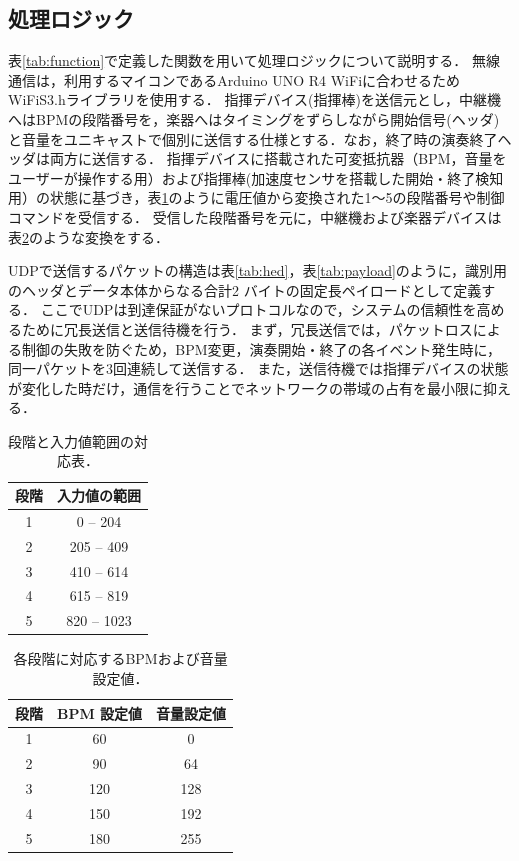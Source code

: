 \documentclass[lualatex,book,paper=a4paper,jafontsize=11.5pt,jafontscale=1.05]{jlreq}
\begin{document}
\subsection{処理ロジック}
表\ref{tab:function}で定義した関数を用いて処理ロジックについて説明する．
無線通信は，利用するマイコンであるArduino UNO R4 WiFiに合わせるためWiFiS3.hライブラリを使用する．
指揮デバイス(指揮棒)を送信元とし，中継機へはBPMの段階番号を，楽器へはタイミングをずらしながら開始信号(ヘッダ)と音量をユニキャストで個別に送信する仕様とする．なお，終了時の演奏終了ヘッダは両方に送信する．
指揮デバイスに搭載された可変抵抗器（BPM，音量をユーザーが操作する用）および指揮棒(加速度センサを搭載した開始・終了検知用）の状態に基づき，表\ref{tab:range}のように電圧値から変換された1～5の段階番号や制御コマンドを受信する．
受信した段階番号を元に，中継機および楽器デバイスは表\ref{tab:bpm_volume}のような変換をする．

UDPで送信するパケットの構造は表\ref{tab:hed}，表\ref{tab:payload}のように，識別用のヘッダとデータ本体からなる合計2 バイトの固定長ペイロードとして定義する．
ここでUDPは到達保証がないプロトコルなので，システムの信頼性を高めるために冗長送信と送信待機を行う．
まず，冗長送信では，パケットロスによる制御の失敗を防ぐため，BPM変更，演奏開始・終了の各イベント発生時に，同一パケットを3回連続して送信する．
また，送信待機では指揮デバイスの状態が変化した時だけ，通信を行うことでネットワークの帯域の占有を最小限に抑える．



\begin{table}[H]
\centering
\caption{段階と入力値範囲の対応表．}
\label{tab:range}
\begin{tabular}{c|c}
\hline
段階 & 入力値の範囲 \\ \hline
1 & 0 -- 204 \\ \hline
2 & 205 -- 409 \\ \hline
3 & 410 -- 614 \\ \hline
4 & 615 -- 819 \\ \hline
5 & 820 -- 1023 \\ \hline
\end{tabular}
\end{table}

\begin{table}[H]
\centering
\caption{各段階に対応するBPMおよび音量設定値．}
\label{tab:bpm_volume}
\begin{tabular}{c|c|c}
\hline
段階 & BPM 設定値 & 音量設定値 \\ \hline
1 & 60 & 0 \\ \hline
2 & 90 & 64 \\ \hline
3 & 120 & 128 \\ \hline
4 & 150 & 192 \\ \hline
5 & 180 & 255 \\ \hline
\end{tabular}
\end{table}
\end{document}
